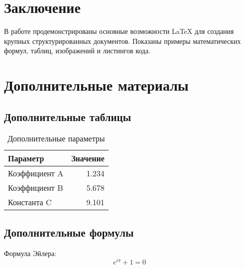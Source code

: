 \documentclass[a4paper,12pt]{article}
\begin{document}
\section{Заключение}
\label{sec:conclusion}

В работе продемонстрированы основные возможности LaTeX для создания крупных структурированных документов. Показаны примеры математических формул, таблиц, изображений и листингов кода.

\appendix
\section{Дополнительные материалы}
\label{sec:appendix}

\subsection{Дополнительные таблицы}

\begin{table}[h]
\centering
\caption{Дополнительные параметры}
\label{tab:additional}
\begin{tabular}{lr}
\toprule
Параметр & Значение \\
\midrule
Коэффициент A & 1.234 \\
Коэффициент B & 5.678 \\
Константа C & 9.101 \\
\bottomrule
\end{tabular}
\end{table}

\subsection{Дополнительные формулы}

Формула Эйлера:
\begin{equation}
e^{i\pi} + 1 = 0
\end{equation}



\end{document}
